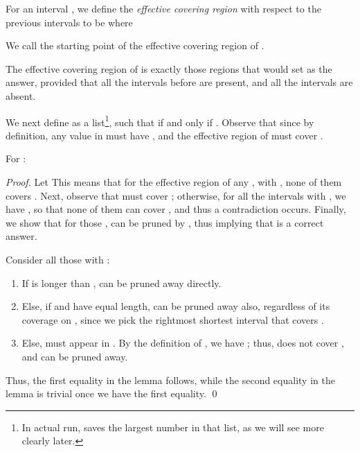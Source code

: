 \documentclass[11pt]{llncs}
\newcommand{\remove}[1]{}
\begin{document}
\remove{
\begin{center}

\end{center}
}

\begin{definition}
For an interval , we define the \emph{effective covering region} 
with respect to the previous intervals 
 to be  where 

We call  the starting point of the effective covering region of .
\end{definition}
The effective covering region of  is exactly those regions that
would set  as the answer, provided that all the intervals  before  are present, and all the intervals  are absent.

\medskip

\noindent
We next define  as a list\footnote{In actual run,
   saves the largest number in that list, as we will see
  more clearly later.}, such that  if and only if . Observe that since  by
definition, any value  in  must have , and the
effective region of  must cover .

\begin{lemma}
\label{lem:b}
For :

\end{lemma}
\begin{proof}
  Let  This means that for the
  effective region of any , with , none of them covers
  .  Next, observe that  must cover ; otherwise, for all
  the intervals  with , we have , so
  that none of them can cover , and thus a contradiction occurs.
Finally, we show that for those ,  can be
    pruned by , thus implying that  is a correct
    answer.

\medskip

\noindent
Consider all those  with :  
\begin{enumerate}
\item If  is longer than ,  can be pruned away
  directly.

\item Else, if  and  have equal length,  can be pruned
  away also, regardless of its coverage on ,
since we pick the rightmost shortest interval that covers
  .

\item Else,  must appear in . By the
  definition of , we have ; thus,  does
  not cover , and can be pruned away.
\end{enumerate}
\remove{
\begin{enumerate}
\item If  is no shorter than ,  can be pruned away
  directly.

\item Else, if  appears in , by the
  definition of , we have ; thus.  does
  not cover , and can be pruned away.

\item Else,  does not appear in .  Then,
  we have , so that the effective region of  does not
  cover ; so  can be pruned away.
\end{enumerate}
}
Thus, the first equality in the lemma follows, while the second
equality in the lemma is trivial once we have the first equality. 
\qed 
\end{proof}
\end{document}
